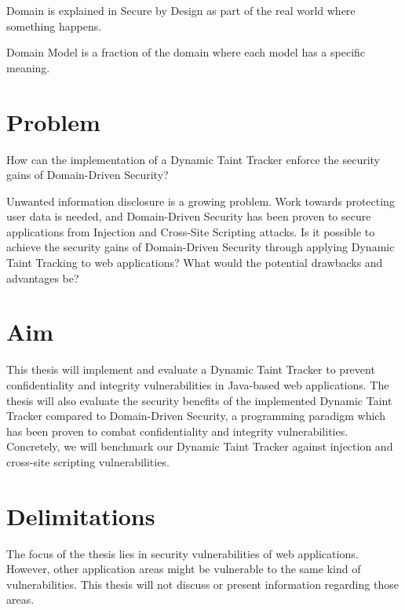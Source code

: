 \begin{definition}{Domain}
    is explained in Secure by Design \parencite{sbd2018} as part of the real world where something happens.
    \\
\end{definition}

\begin{definition}{Domain Model}
    is a fraction of the domain where each model has a specific meaning.
    \\
\end{definition}



\section{Problem}
\label{Problem}
\begin{chapquote}{}
    How can the implementation of a Dynamic Taint Tracker enforce the security gains of Domain-Driven Security?
\end{chapquote}

\noindent
Unwanted information disclosure is a growing problem. Work towards protecting user data is needed, and Domain-Driven Security has been proven to secure applications from Injection and Cross-Site Scripting attacks. Is it possible to achieve the security gains of Domain-Driven Security through applying Dynamic Taint Tracking to web applications? What would the potential drawbacks and advantages be?



\section{Aim}
\label{Aim}
This thesis will implement and evaluate a Dynamic Taint Tracker to prevent confidentiality and integrity vulnerabilities in Java-based web applications. The thesis will also evaluate the security benefits of the implemented Dynamic Taint Tracker compared to Domain-Driven Security, a programming paradigm which has been proven to combat confidentiality and integrity vulnerabilities. Concretely, we will benchmark our Dynamic Taint Tracker against injection and cross-site scripting vulnerabilities.



\section{Delimitations}
\label{Delimitations}
The focus of the thesis lies in security vulnerabilities of web applications. However, other application areas might be vulnerable to the same kind of vulnerabilities.  This thesis will not discuss or present information regarding those areas.

